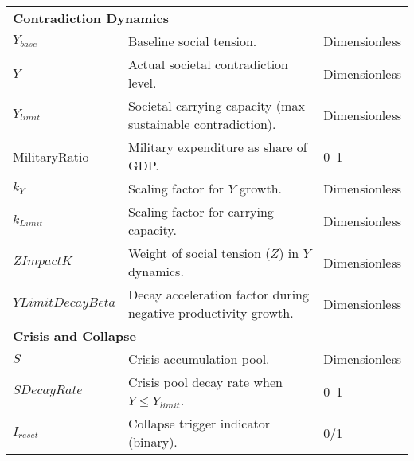 \documentclass{article}
\begin{document}
\begin{longtable}{p{3cm} p{6cm} p{3cm}}
\multicolumn{3}{l}{\textbf{Contradiction Dynamics}} \\
$Y_{base}$            & Baseline social tension. & Dimensionless \\
$Y$                   & Actual societal contradiction level. & Dimensionless \\
$Y_{limit}$           & Societal carrying capacity (max sustainable contradiction). & Dimensionless \\
MilitaryRatio         & Military expenditure as share of GDP. & 0–1 \\
$k_Y$                 & Scaling factor for $Y$ growth. & Dimensionless \\
$k_{Limit}$           & Scaling factor for carrying capacity. & Dimensionless \\
$ZImpactK$            & Weight of social tension ($Z$) in $Y$ dynamics. & Dimensionless \\
$YLimitDecayBeta$     & Decay acceleration factor during negative productivity growth. & Dimensionless \\

\multicolumn{3}{l}{\textbf{Crisis and Collapse}} \\
$S$                   & Crisis accumulation pool. & Dimensionless \\
$SDecayRate$          & Crisis pool decay rate when $Y \leq Y_{limit}$. & 0–1 \\
$I_{reset}$           & Collapse trigger indicator (binary). & 0/1 \\

\hline
\end{longtable}
\end{document}
